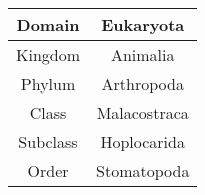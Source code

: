 \begin{flushleft}
\begin{tabular}{ || c | c || } 
 \hline
 Domain & Eukaryota \\ 
 \hline
 Kingdom & Animalia \\ 
 \hline
 Phylum & Arthropoda \\ 
 \hline
 Class & Malacostraca \\
 \hline
 Subclass & Hoplocarida \\
 \hline
 Order & Stomatopoda \\
 \hline
\end{tabular}
\end{flushleft}